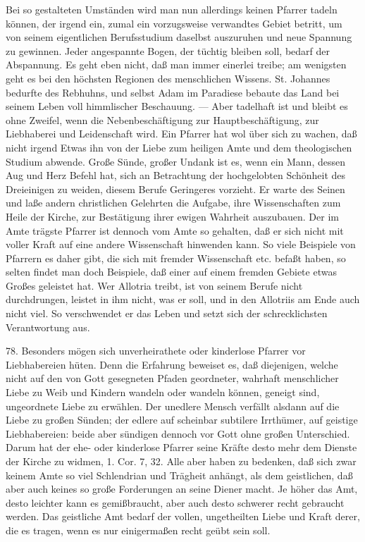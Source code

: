 Bei so gestalteten Umständen wird man nun allerdings keinen Pfarrer tadeln können, der irgend ein, zumal ein vorzugsweise verwandtes Gebiet betritt, um von seinem eigentlichen Berufsstudium daselbst auszuruhen und neue Spannung zu gewinnen. Jeder angespannte Bogen, der tüchtig bleiben soll, bedarf der Abspannung. Es geht eben nicht, daß man immer einerlei treibe; am wenigsten geht
es bei den höchsten Regionen des menschlichen Wissens. St. Johannes bedurfte des Rebhuhns, und selbst Adam im Paradiese bebaute das Land bei seinem Leben voll himmlischer Beschauung. — Aber tadelhaft ist und bleibt es ohne Zweifel, wenn die Nebenbeschäftigung zur Hauptbeschäftigung, zur Liebhaberei und Leidenschaft wird. Ein Pfarrer hat wol über sich zu wachen, daß nicht irgend Etwas ihn von der Liebe zum heiligen Amte und dem theologischen Studium abwende. Große Sünde, großer Undank ist es, wenn ein Mann, dessen Aug und Herz Befehl hat, sich an Betrachtung der hochgelobten Schönheit des Dreieinigen zu weiden, diesem Berufe Geringeres vorzieht. Er warte des Seinen und laße andern christlichen Gelehrten die Aufgabe, ihre Wissenschaften zum Heile der Kirche, zur Bestätigung ihrer ewigen Wahrheit auszubauen. Der im Amte trägste Pfarrer ist dennoch vom Amte so gehalten, daß er sich nicht mit voller Kraft auf eine andere Wissenschaft hinwenden kann. So viele Beispiele von Pfarrern es daher gibt, die sich mit fremder Wissenschaft etc. befaßt haben, so selten findet man doch Beispiele, daß einer auf einem fremden Gebiete etwas Großes geleistet hat. Wer Allotria treibt, ist von seinem Berufe nicht durchdrungen, leistet in ihm nicht, was er soll, und in den Allotriis am Ende auch nicht viel. So verschwendet er das Leben und setzt sich der schrecklichsten Verantwortung aus.

78. Besonders mögen sich unverheirathete oder kinderlose Pfarrer vor Liebhabereien hüten. Denn die Erfahrung beweiset es, daß diejenigen, welche nicht auf
den von Gott gesegneten Pfaden geordneter, wahrhaft menschlicher Liebe zu Weib und Kindern wandeln oder wandeln können, geneigt sind, ungeordnete Liebe zu erwählen. Der unedlere Mensch verfällt alsdann auf die Liebe zu großen Sünden; der edlere auf scheinbar subtilere Irrthümer, auf geistige Liebhabereien: beide aber sündigen dennoch vor Gott ohne großen Unterschied. Darum hat der ehe- oder kinderlose Pfarrer seine Kräfte desto mehr dem Dienste der Kirche zu widmen, 1. Cor. 7, 32. Alle aber haben zu bedenken, daß sich zwar keinem Amte so viel Schlendrian und Trägheit anhängt, als dem geistlichen, daß aber auch keines so große Forderungen an seine Diener macht. Je höher das Amt, desto leichter kann es gemißbraucht, aber auch desto schwerer recht gebraucht werden. Das geistliche Amt bedarf der vollen, ungetheilten Liebe und Kraft derer, die es tragen, wenn es nur einigermaßen recht geübt sein soll.

